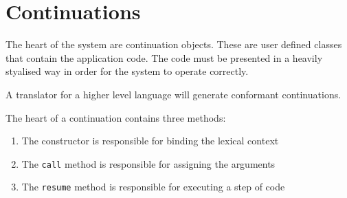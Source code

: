 \documentclass[oneside]{book}
\begin{document}
\chapter{Continuations}
The heart of the system are continuation objects. These are user defined
classes that contain the application code. The code must be presented
in a heavily styalised way in order for the system to operate correctly.

A translator for a higher level language will generate conformant
continuations.

The heart of a continuation contains three methods:
\begin{enumerate}
\item The constructor is responsible for binding the lexical context
\item The \verb$call$ method is responsible for assigning the arguments
\item The \verb$resume$ method is responsible for executing a step of code
\end{enumerate}
\end{document}
